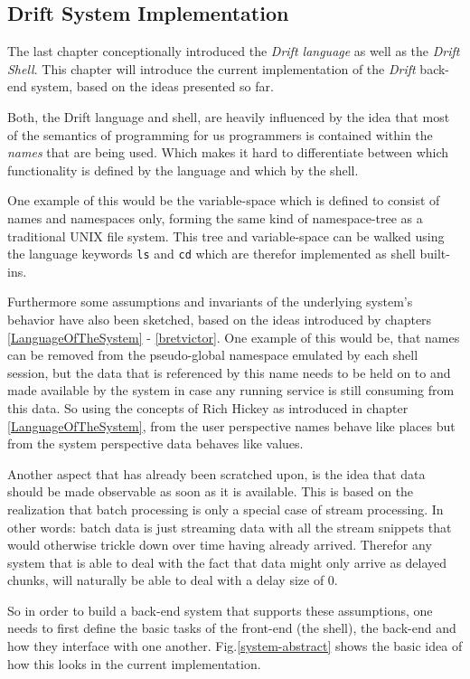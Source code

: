 \subsection{Drift System Implementation}
\label{driftimplementation}

The last chapter conceptionally introduced the \textit{Drift language}
as well as the \textit{Drift Shell}. This chapter will introduce
the current implementation of the \textit{Drift} back-end system,
based on the ideas presented so far.

Both, the Drift language and shell, are heavily influenced
by the idea that most of the semantics of programming for us
programmers is contained within the \textit{names} that are being
used. Which makes it hard to differentiate between which
functionality is defined by the language and which by the shell.

One example of this would be the variable-space which is
defined to consist of names and namespaces only, forming the same
kind of namespace-tree as a traditional UNIX file system.
This tree and variable-space can be walked using the language
keywords \texttt{ls} and \texttt{cd} which are therefor implemented
as shell built-ins.

Furthermore some assumptions and invariants of the underlying
system's behavior have also been sketched, based on the ideas
introduced by chapters \ref{LanguageOfTheSystem} - \ref{bretvictor}.
One example of this would be, that names can be removed from
the pseudo-global namespace emulated by each shell session,
but the data that is referenced by this name needs to be
held on to and made available by the system in case any
running service is still consuming from this data.
So using the concepts of Rich Hickey as introduced in
chapter \ref{LanguageOfTheSystem}, from the user perspective
names behave like places but from the system perspective
data behaves like values.

Another aspect that has already been scratched upon, is the
idea that data should be made observable as soon as it is
available. This is based on the realization that batch
processing is only a special case of stream processing.
In other words: batch data is just streaming data with all
the stream snippets that would otherwise trickle down
over time having already arrived. Therefor any system that
is able to deal with the fact that data might only arrive
as delayed chunks, will naturally be able to deal with a
delay size of 0.

So in order to build a back-end system that supports these
assumptions, one needs to first define the basic tasks of
the front-end (the shell), the back-end and how they interface
with one another. Fig.\ref{system-abstract} shows the
basic idea of how this looks in the current implementation.

